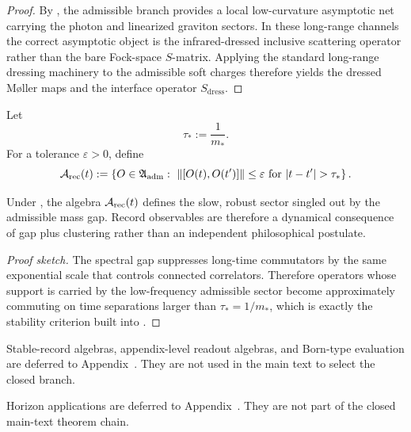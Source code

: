 \begin{proof}
By , the admissible branch
provides a local low-curvature asymptotic net carrying the photon and linearized graviton sectors.
In these long-range channels the correct asymptotic object is the infrared-dressed inclusive
scattering operator rather than the bare Fock-space $S$-matrix. Applying the standard long-range
dressing machinery to the admissible soft charges therefore yields the dressed M\o ller maps and
the interface operator $S_{\mathrm{dress}}$.
\end{proof}

\begin{definition}
\label{def:stable-record-algebra}
Let
\[
\tau_*:=\frac{1}{m_*}.
\]
For a tolerance $\varepsilon>0$, define
\[
\Arec(t)
:=
\left\{
O\in\mathfrak A_{\mathrm{adm}}
:\ \|[O(t),O(t')]\|\le\varepsilon
\text{ for } |t-t'|>\tau_*
\right\}.
\]
\end{definition}

\begin{proposition}
Under , the algebra $\mathcal A_{\mathrm{rec}}(t)$ defines the slow, robust sector singled out by the admissible mass gap. Record observables are therefore a dynamical consequence of gap plus clustering rather than an independent philosophical postulate.
\end{proposition}

\begin{proof}[Proof sketch]
The spectral gap suppresses long-time commutators by the same exponential scale that controls connected correlators. Therefore operators whose support is carried by the low-frequency admissible sector become approximately commuting on time separations larger than $\tau_*=1/m_*$, which is exactly the stability criterion built into .
\end{proof}

\begin{remark}
Stable-record algebras, appendix-level readout algebras, and Born-type evaluation are deferred to
Appendix~. They are not used in the main text to select the closed branch.
\end{remark}

\begin{remark}
Horizon applications are deferred to Appendix~. They are not part of the closed
main-text theorem chain.
\end{remark}


